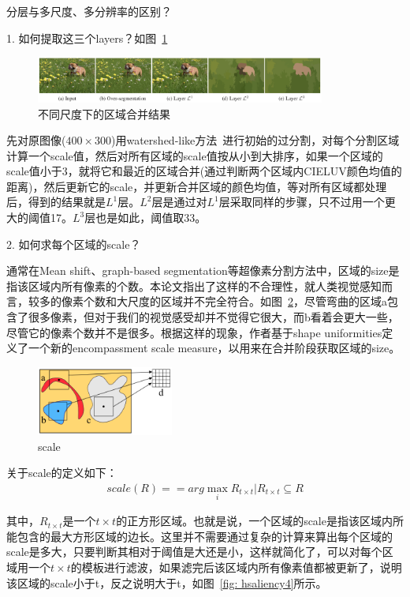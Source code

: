 \documentclass[12pt]{article}
\begin{document}
分层与多尺度、多分辨率的区别？

1. 如何提取这三个layers？如图~\ref{fig: hsaliency2}

\begin{figure}[!ht]
\centering
\includegraphics[width=0.85\textwidth]{hsaliency2.png}
\caption{不同尺度下的区域合并结果}
\label{fig: hsaliency2}
\end{figure}

先对原图像($400 \times 300$)用watershed-like方法~\cite{gonzalez2009digital}进行初始的过分割，对每个分割区域计算一个scale值，然后对所有区域的scale值按从小到大排序，如果一个区域的scale值小于3，就将它和最近的区域合并(通过判断两个区域内CIELUV颜色均值的距离)，然后更新它的scale，并更新合并区域的颜色均值，等对所有区域都处理后，得到的结果就是$L^1$层。$L^2$层是通过对$L^1$层采取同样的步骤，只不过用一个更大的阈值17。$L^3$层也是如此，阈值取33。

2. 如何求每个区域的scale？

通常在Mean shift、graph-based segmentation等超像素分割方法中，区域的size是指该区域内所有像素的个数。本论文指出了这样的不合理性，就人类视觉感知而言，较多的像素个数和大尺度的区域并不完全符合。如图~\ref{fig: hsaliency3}，尽管弯曲的区域a包含了很多像素，但对于我们的视觉感受却并不觉得它很大，而b看着会更大一些，尽管它的像素个数并不是很多。根据这样的现象，作者基于shape uniformities定义了一个新的encompassment scale measure，以用来在合并阶段获取区域的size。

\begin{figure}[!ht]
\centering
\includegraphics[width=0.4\textwidth]{hsaliency3.png}
\caption{scale}
\label{fig: hsaliency3}
\end{figure}

关于scale的定义如下：
\begin{align}
scale(R) == arg \max_i {R_{t \times t}|R_{t \times t} \subseteq R}
\end{align}

其中，$R_{t \times t}$是一个$t \times t$的正方形区域。也就是说，一个区域的scale是指该区域内所能包含的最大方形区域的边长。这里并不需要通过复杂的计算来算出每个区域的scale是多大，只要判断其相对于阈值是大还是小，这样就简化了，可以对每个区域用一个$t \times t$的模板进行滤波，如果滤完后该区域内所有像素值都被更新了，说明该区域的scale小于t，反之说明大于t，如图~\ref{fig: hsaliency4}所示。
\end{document}

